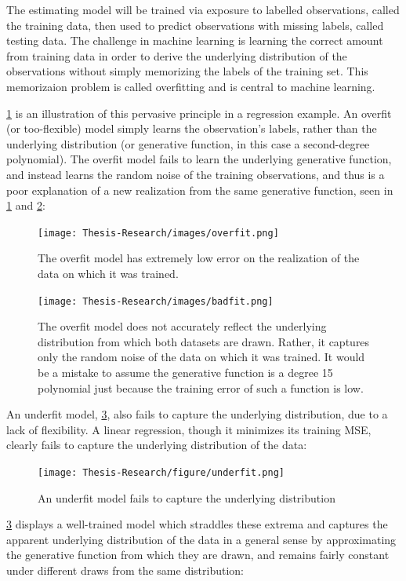 \documentclass[12pt,twoside]{reedthesis}
\begin{document}
The estimating model will be trained via exposure to labelled
observations, called the training data, then used to predict
observations with missing labels, called testing data. The challenge in
machine learning is learning the correct amount from training data in
order to derive the underlying distribution of the observations without
simply memorizing the labels of the training set. This memorizaion
problem is called overfitting and is central to machine learning.

\ref{fig:overfit} is an illustration of this pervasive principle in a
regression example. An overfit (or too-flexible) model simply learns the
observation's labels, rather than the underlying distribution (or
generative function, in this case a second-degree polynomial). The
overfit model fails to learn the underlying generative function, and
instead learns the random noise of the training observations, and thus
is a poor explanation of a new realization from the same generative
function, seen in \ref{fig:overfit} and \ref{fig:overfitre}:
\begin{figure}
\centering
\texttt{[image: Thesis-Research/images/overfit.png]}
\caption{\label{fig:overfit}The overfit model has extremely low error on the
realization of the data on which it was trained.}
\end{figure}
\begin{figure}
\centering
\texttt{[image: Thesis-Research/images/badfit.png]}
\caption{\label{fig:overfitre}The overfit model does not accurately reflect
the underlying distribution from which both datasets are drawn. Rather,
it captures only the random noise of the data on which it was trained.
It would be a mistake to assume the generative function is a degree 15
polynomial just because the training error of such a function is low.}
\end{figure}
An underfit model, \ref{fig:underfit}, also fails to capture the
underlying distribution, due to a lack of flexibility. A linear
regression, though it minimizes its training MSE, clearly fails to
capture the underlying distribution of the data:
\begin{figure}
\centering
\texttt{[image: Thesis-Research/figure/underfit.png]}
\caption{\label{fig:underfit}An underfit model fails to capture the
underlying distribution}
\end{figure}
\ref{fig:underfit} displays a well-trained model which straddles these
extrema and captures the apparent underlying distribution of the data in
a general sense by approximating the generative function from which they
are drawn, and remains fairly constant under different draws from the
same distribution:
\end{document}
